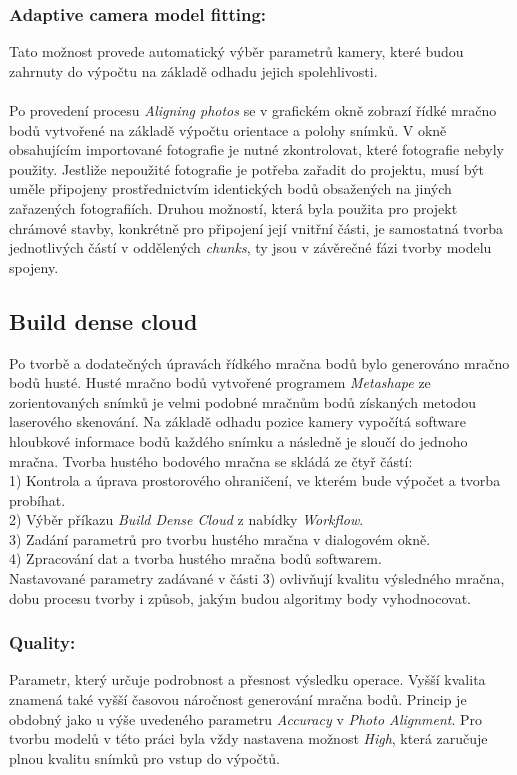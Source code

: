\documentclass[a4paper, 12pt]{report}
\begin{document}
\subsubsection*{Adaptive camera model fitting:} 
Tato možnost provede automatický výběr parametrů kamery, které budou zahrnuty do výpočtu na základě odhadu jejich spolehlivosti.\\
\\
Po provedení procesu \textit{Aligning photos} se v grafickém okně zobrazí řídké mračno bodů vytvořené na základě výpočtu orientace a polohy snímků. V okně obsahujícím importované fotografie je nutné zkontrolovat, které fotografie nebyly použity. Jestliže nepoužité fotografie je potřeba zařadit do projektu, musí být uměle připojeny prostřednictvím identických bodů obsažených na jiných zařazených fotografiích. Druhou možností, která byla použita pro projekt chrámové stavby, konkrétně pro připojení její vnitřní části, je samostatná tvorba jednotlivých částí v oddělených \textit{chunks}, ty jsou v závěrečné fázi tvorby modelu spojeny. 

\subsection{Build dense cloud}
Po tvorbě a dodatečných úpravách řídkého mračna bodů bylo generováno mračno bodů husté. Husté mračno bodů vytvořené programem \textit{Metashape} ze zorientovaných snímků je velmi podobné mračnům bodů získaných metodou laserového skenování. Na základě odhadu pozice kamery vypočítá software hloubkové informace bodů každého snímku a následně je sloučí do jednoho mračna. Tvorba hustého bodového mračna se skládá ze čtyř částí:\\
1) Kontrola a úprava prostorového ohraničení, ve kterém bude výpočet a tvorba probíhat. \\
2) Výběr příkazu \textit{Build Dense Cloud} z nabídky \textit{Workflow}.\\
3) Zadání parametrů pro tvorbu hustého mračna v dialogovém okně. \\
4) Zpracování dat a tvorba hustého mračna bodů softwarem. \\
Nastavované parametry zadávané v části 3) ovlivňují kvalitu výsledného mračna, dobu procesu tvorby i způsob, jakým budou algoritmy body vyhodnocovat. 

\subsubsection*{Quality:}
Parametr, který určuje podrobnost a přesnost výsledku operace. Vyšší kvalita znamená také vyšší časovou náročnost generování mračna bodů. Princip je obdobný jako u výše uvedeného parametru \textit{Accuracy} v \textit{Photo Alignment}. Pro tvorbu modelů v této práci byla vždy nastavena možnost \textit{High}, která zaručuje plnou kvalitu snímků pro vstup do výpočtů.
\end{document}
